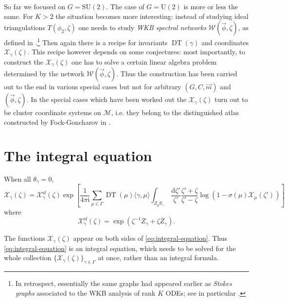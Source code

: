 \documentclass[12pt,letterpaper,reqno]{article}
\numberwithin{equation}{section}
\newcommand{\cM}{\ensuremath{\mathcal M}}
\newcommand{\cX}{\ensuremath{\mathcal X}}
\newcommand{\cW}{\ensuremath{\mathcal W}}
\newcommand{\R}{\ensuremath{\mathbb R}}
\newcommand{\I}{{\mathrm i}}
\newcommand{\de}{\mathrm{d}}
\renewcommand{\sf}{\mathrm{sf}}
\newcommand{\IP}[1]{\langle#1\rangle}
\newcommand{\vphi}{{\vec\phi}}
\newcommand{\ti}[1]{\textit{#1}}
\DeclareMathOperator{\DT}{DT}
\newcommand{\SU}{\mathrm{SU}}
\newcommand{\U}{\mathrm{U}}
\begin{document}
\begin{remark}
So far we focused on $G = \SU(2)$. The case of $G = \U(2)$ is more or
less the same. For $K>2$ the situation becomes more interesting:
instead of studying ideal triangulations $T(\phi_2, \zeta)$ 
one needs to study \ti{WKB spectral networks} $\cW(\vphi, \zeta)$, as defined in \cite{Gaiotto2012}.\footnote{In retrospect,
essentially the same graphs had appeared earlier as 
\ti{Stokes graphs} associated to the WKB analysis of
rank $K$ ODEs; see in particular \cite{berk:988}.}
Then again there is a recipe for invariants $\DT(\gamma)$
and coordinates $\cX_\gamma(\zeta)$. This recipe however 
depends on some conjectures:
most importantly, to construct the $\cX_\gamma(\zeta)$ 
one has to solve a certain linear algebra problem determined by the 
network $\cW(\vphi,\zeta)$.
Thus the construction has been carried out to the end in various special
cases but not for arbitrary $(G,C,\vec{m})$ and $(\vphi, \zeta)$. In the special cases which have been worked out
\cite{Gaiotto:2012db,Neitzke:2017yos} the $\cX_\gamma(\zeta)$
turn out to be cluster coordinate systems on $\cM$,
i.e. they belong to the distinguished atlas constructed
by Fock-Goncharov in \cite{MR2233852}.
\end{remark}

\section{The integral equation}

\begin{conj}[Integral equation for $\theta_\gamma = 0$] \label{conj:integral-equation}
When all $\theta_\gamma = 0$,
\begin{equation} \label{eq:integral-equation}
  \cX_\gamma(\zeta) = \cX_\gamma^\sf(\zeta) \exp \left[ \frac{1}{4\pi \I} \sum_{\mu \in \Gamma} \DT(\mu) \IP{\gamma,\mu} \int_{Z_\mu \R_-} \frac{\de \zeta'}{\zeta'} \frac{\zeta' + \zeta}{\zeta'-\zeta} \log(1 - \sigma(\mu) \cX_\mu(\zeta')) \right]
\end{equation}
where 
\begin{equation}
  \cX_\gamma^\sf(\zeta) = \exp \left( \zeta^{-1} Z_\gamma + \zeta \overline{Z}_\gamma \right).
\end{equation}
\end{conj}
The functions $\cX_\gamma(\zeta)$ appear on both sides of
\eqref{eq:integral-equation}. Thus \eqref{eq:integral-equation} is an integral equation, which needs to be solved for 
the whole collection $\{\cX_\gamma(\zeta)\}_{\gamma \in \Gamma}$
at once, rather than an integral formula.
\end{document}
